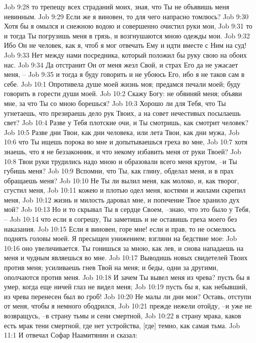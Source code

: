Job 9:28  то трепещу всех страданий моих, зная, что Ты не объявишь меня невинным.
Job 9:29  Если же я виновен, то для чего напрасно томлюсь?
Job 9:30  Хотя бы я омылся и снежною водою и совершенно очистил руки мои,
Job 9:31  то и тогда Ты погрузишь меня в грязь, и возгнушаются мною одежды мои.
Job 9:32  Ибо Он не человек, как я, чтоб я мог отвечать Ему и идти вместе с Ним на суд!
Job 9:33  Нет между нами посредника, который положил бы руку свою на обоих нас.
Job 9:34  Да отстранит Он от меня жезл Свой, и страх Его да не ужасает меня, --
Job 9:35  и тогда я буду говорить и не убоюсь Его, ибо я не таков сам в себе.
Job 10:1  Опротивела душе моей жизнь моя; предамся печали моей; буду говорить в горести души моей.
Job 10:2  Скажу Богу: не обвиняй меня; объяви мне, за что Ты со мною борешься?
Job 10:3  Хорошо ли для Тебя, что Ты угнетаешь, что презираешь дело рук Твоих, а на совет нечестивых посылаешь свет?
Job 10:4  Разве у Тебя плотские очи, и Ты смотришь, как смотрит человек?
Job 10:5  Разве дни Твои, как дни человека, или лета Твои, как дни мужа,
Job 10:6  что Ты ищешь порока во мне и допытываешься греха во мне,
Job 10:7  хотя знаешь, что я не беззаконник, и что некому избавить меня от руки Твоей?
Job 10:8  Твои руки трудились надо мною и образовали всего меня кругом, --и Ты губишь меня?
Job 10:9  Вспомни, что Ты, как глину, обделал меня, и в прах обращаешь меня?
Job 10:10  Не Ты ли вылил меня, как молоко, и, как творог, сгустил меня,
Job 10:11  кожею и плотью одел меня, костями и жилами скрепил меня,
Job 10:12  жизнь и милость даровал мне, и попечение Твое хранило дух мой?
Job 10:13  Но и то скрывал Ты в сердце Своем, --знаю, что это было у Тебя, --
Job 10:14  что если я согрешу, Ты заметишь и не оставишь греха моего без наказания.
Job 10:15  Если я виновен, горе мне! если и прав, то не осмелюсь поднять головы моей. Я пресыщен унижением; взгляни на бедствие мое:
Job 10:16  оно увеличивается. Ты гонишься за мною, как лев, и снова нападаешь на меня и чудным являешься во мне.
Job 10:17  Выводишь новых свидетелей Твоих против меня; усиливаешь гнев Твой на меня; и беды, одни за другими, ополчаются против меня.
Job 10:18  И зачем Ты вывел меня из чрева? пусть бы я умер, когда еще ничей глаз не видел меня;
Job 10:19  пусть бы я, как небывший, из чрева перенесен был во гроб!
Job 10:20  Не малы ли дни мои? Оставь, отступи от меня, чтобы я немного ободрился,
Job 10:21  прежде нежели отойду, --и уже не возвращусь, --в страну тьмы и сени смертной,
Job 10:22  в страну мрака, каков есть мрак тени смертной, где нет устройства, [где] темно, как самая тьма.
Job 11:1  И отвечал Софар Наамитянин и сказал:
